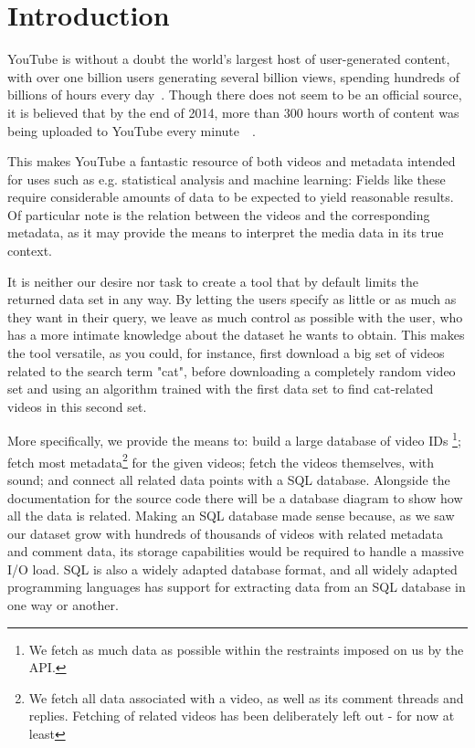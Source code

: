 
\section{Introduction}

YouTube is without a doubt the world's largest host of user-generated content,
with over one billion users generating several billion views, spending hundreds
of billions of hours every day~\cite{officialstats}. Though there does not seem
to be an official source, it is believed that by the end of 2014, more than 300
hours worth of content was being uploaded to YouTube every
minute~\cite{dagensmediastats}~\cite{reelseostats}. 

This makes YouTube a fantastic resource of both videos and metadata intended for
uses such as e.g. statistical analysis and machine learning: Fields like these
require considerable amounts of data to be expected to yield reasonable results.
Of particular note is the relation between the videos and the corresponding 
metadata, as it may provide the means to interpret the media data in its true
context.

It is neither our desire nor task to create a tool that by default limits the
returned data set in any way. By letting the users specify as little or as much
as they want in their query, we leave as much control as possible with the user,
who has a more intimate knowledge about the dataset he wants to obtain.
This makes the tool versatile, as you could, for instance, first
download a big set of videos related to the search term "cat", before
downloading a completely random video set and using an algorithm trained with
the first data set to find cat-related videos in this second set. 

More specifically, we provide the means to: build a large database of video IDs
\footnote{We fetch as much data as possible within the restraints imposed
on us by the API.}; fetch most metadata\footnote{We fetch all data associated
with a video, as well as its comment threads and replies. Fetching of related
videos has been deliberately left out - for now at least} for the given videos;
fetch the videos themselves, with sound; and connect all related data points
with a SQL database. Alongside the documentation for the source code there will
be a database diagram to show how all the data is related. Making an SQL database
made sense because, as we saw our dataset grow with hundreds of thousands of
videos with related metadata and comment data, its storage capabilities
would be required
to handle a massive I/O load. SQL is also a widely adapted database
format, and all widely adapted programming languages has support for
extracting data from an SQL database in one way or another.

